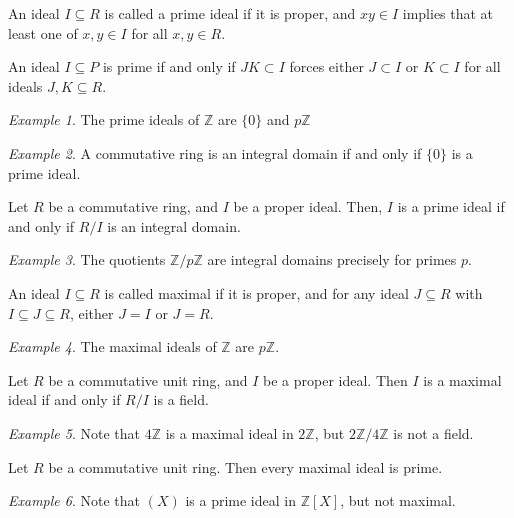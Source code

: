 \documentclass[11pt]{article}
\newcommand{\Z}{\mathbb{Z}}
\theoremstyle{definition}
\theoremstyle{remark}
\newtheorem*{example}{Example}
\numberwithin{equation}{section}
\begin{document}
    \begin{definition}
        An ideal $I \subseteq R$ is called a prime ideal if it is proper, and $xy \in
        I$ implies that at least one of $x, y \in I$ for all $x, y \in R$.
    \end{definition}

    \begin{lemma}
        An ideal $I \subseteq P$ is prime if and only if $JK \subset I$ forces either
        $J \subset I$ or $K \subset I$ for all ideals $J, K \subseteq R$.
    \end{lemma}

    \begin{example}
        The prime ideals of $\Z$ are $\{0\}$ and $p\Z$
    \end{example}
    \begin{example}
        A commutative ring is an integral domain if and only if $\{0\}$ is a prime
        ideal.
    \end{example}

    \begin{theorem}
        Let $R$ be a commutative ring, and $I$ be a proper ideal. Then, $I$ is a
        prime ideal if and only if $R/I$ is an integral domain.
    \end{theorem}
    \begin{example}
        The quotients $\Z/p\Z$ are integral domains precisely for primes $p$.
    \end{example}

    \begin{definition}
        An ideal $I \subseteq R$ is called maximal if it is proper, and for any ideal
        $J \subseteq R$ with $I \subseteq J \subseteq R$, either $J = I$ or $J = R$.
    \end{definition}
    \begin{example}
        The maximal ideals of $\Z$ are $p\Z$.
    \end{example}

    \begin{theorem}
        Let $R$ be a commutative unit ring, and $I$ be a proper ideal. Then $I$ is a
        maximal ideal if and only if $R/I$ is a field.
    \end{theorem}
    \begin{example}
        Note that $4\Z$ is a maximal ideal in $2\Z$, but $2\Z / 4\Z$ is not a field.
    \end{example}

    \begin{lemma}
        Let $R$ be a commutative unit ring. Then every maximal ideal is prime.
    \end{lemma}
    \begin{example}
        Note that $(X)$ is a prime ideal in $\Z[X]$, but not maximal.
    \end{example}
\end{document}
